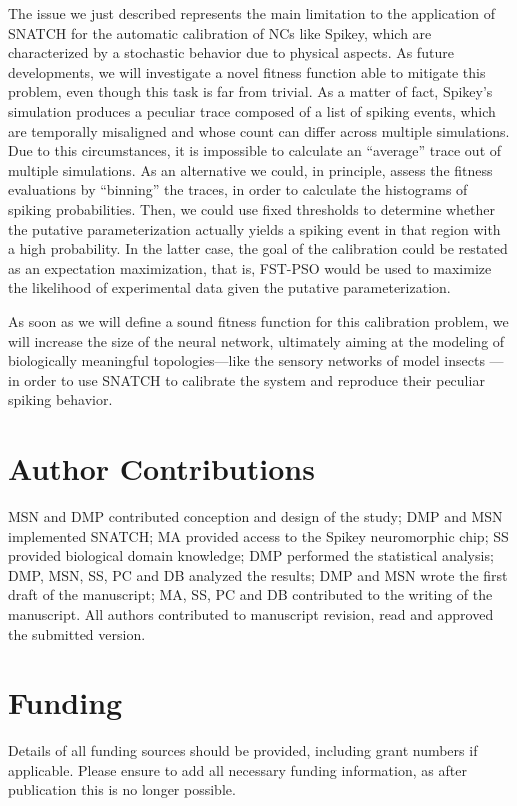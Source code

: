 \documentclass[utf8]{frontiersFPHY} %
\newcommand {\name}{SNATCH}
\begin{document}
The issue we just described represents the main limitation to the application of \name{} for the automatic calibration of NCs like Spikey, which are  characterized by a stochastic behavior due to physical aspects. 
As future developments, we will investigate a novel fitness function able to mitigate this problem, even though this task is far from trivial.
As a matter of fact, Spikey's simulation produces a peculiar trace composed of a list of spiking events, which are temporally misaligned and whose count can differ across multiple simulations. 
Due to this circumstances, it is impossible to calculate an ``average'' trace out of multiple simulations.
As an alternative we could, in principle, assess the fitness evaluations by ``binning'' the traces, in order to calculate the histograms of spiking probabilities.
Then, we could use fixed thresholds to determine whether the putative parameterization actually yields a spiking event in that region with a high probability. 
In the latter case, the goal of the calibration could be restated as an expectation maximization, that is, FST-PSO would be used to maximize the likelihood of experimental data given the putative parameterization.

As soon as we will define a sound fitness function for this calibration problem, we will increase the size of the neural network, ultimately aiming at the modeling of biologically meaningful topologies---like the sensory networks of model insects  \cite{namiki2009reconstruction,Pfeil2013}---in order to use \name{} to calibrate the system and reproduce their peculiar spiking behavior.

\section*{Author Contributions}
MSN and DMP contributed conception and design of the study; DMP and MSN implemented SNATCH; MA provided access to the Spikey neuromorphic chip; SS provided biological domain knowledge; DMP performed the statistical analysis; DMP, MSN, SS, PC and DB analyzed the results; DMP and MSN wrote the first draft of the manuscript; MA, SS, PC and DB contributed to the writing of the manuscript. All authors contributed to manuscript revision, read and approved the submitted version.

\section*{Funding}
Details of all funding sources should be provided, including grant numbers if applicable. Please ensure to add all necessary funding information, as after publication this is no longer possible.
\end{document}
